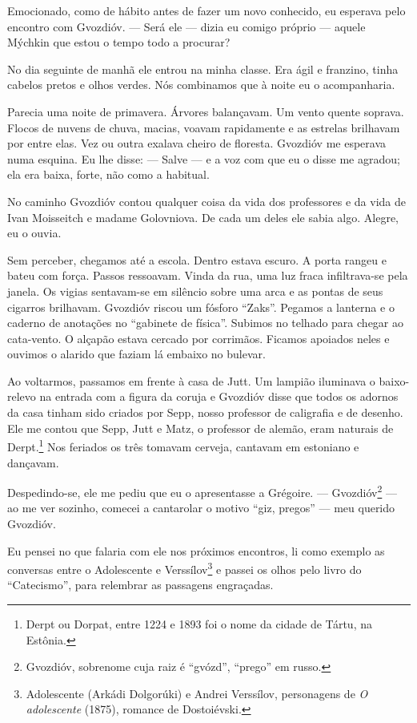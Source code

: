 Emocionado, como de hábito antes de fazer um novo conhecido, eu esperava
pelo encontro com Gvozdióv. --- Será ele --- dizia eu comigo próprio ---
aquele Mýchkin que estou o tempo todo a procurar?

No dia seguinte de manhã ele entrou na minha classe. Era ágil e
franzino, tinha cabelos pretos e olhos verdes. Nós combinamos que à
noite eu o acompanharia.

Parecia uma noite de primavera. Árvores balançavam. Um vento quente
soprava. Flocos de nuvens de chuva, macias, voavam rapidamente e as
estrelas brilhavam por entre elas. Vez ou outra exalava cheiro de
floresta. Gvozdióv me esperava numa esquina. Eu lhe disse: --- Salve ---
e a voz com que eu o disse me agradou; ela era baixa, forte, não como a
habitual.

No caminho Gvozdióv contou qualquer coisa da vida dos professores e da
vida de Ivan Moisseitch e madame Golovniova. De cada um deles ele sabia
algo. Alegre, eu o ouvia.

Sem perceber, chegamos até a escola. Dentro estava escuro. A porta
rangeu e bateu com força. Passos ressoavam. Vinda da rua, uma luz fraca
infiltrava-se pela janela. Os vigias sentavam-se em silêncio sobre uma
arca e as pontas de seus cigarros brilhavam. Gvozdióv riscou um fósforo
``Zaks''. Pegamos a lanterna e o caderno de anotações no ``gabinete de
física''. Subimos no telhado para chegar ao cata-vento. O alçapão estava
cercado por corrimãos. Ficamos apoiados neles e ouvimos o alarido que
faziam lá embaixo no bulevar.

Ao voltarmos, passamos em frente à casa de Jutt. Um lampião iluminava o
baixo-relevo na entrada com a figura da coruja e Gvozdióv disse que
todos os adornos da casa tinham sido criados por Sepp, nosso professor
de caligrafia e de desenho. Ele me contou que Sepp, Jutt e Matz, o
professor de alemão, eram naturais de Derpt.\footnote{Derpt ou Dorpat,
  entre 1224 e 1893 foi o nome da cidade de Tártu, na Estônia.} Nos
feriados os três tomavam cerveja, cantavam em estoniano e dançavam.

Despedindo-se, ele me pediu que eu o apresentasse a Grégoire. ---
Gvozdióv\footnote{Gvozdióv, sobrenome cuja raiz é ``gvózd'', ``prego''
  em russo.} --- ao me ver sozinho, comecei a cantarolar o motivo ``giz,
pregos'' --- meu querido Gvozdióv.

Eu pensei no que falaria com ele nos próximos encontros, li como exemplo
as conversas entre o Adolescente e Verssílov\footnote{Adolescente
  (Arkádi Dolgorúki) e Andrei Verssílov, personagens de \emph{O
  adolescente} (1875), romance de Dostoiévski.} e passei os olhos pelo
livro do ``Catecismo'', para relembrar as passagens engraçadas.

